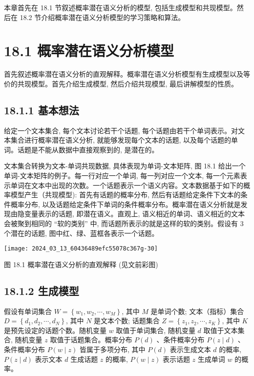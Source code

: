 \documentclass[10pt]{article}
\begin{document}
本章首先在 18.1 节叙述概率潜在语义分析的模型, 包括生成模型和共现模型。然后在 18.2 节介绍概率潜在语义分析模型的学习策略和算法。

\section*{18.1 概率潜在语义分析模型}
首先叙述概率潜在语义分析的直观解释。概率潜在语义分析模型有生成模型以及等价的共现模型。首先介绍生成模型, 然后介绍共现模型, 最后讲解模型的性质。

\subsection*{18.1.1 基本想法}
给定一个文本集合, 每个文本讨论若干个话题, 每个话题由若干个单词表示。对文本集合进行概率潜在语义分析, 就能够发现每个文本的话题, 以及每个话题的单词。话题是不能从数据中直接观察到的, 是潜在的。

文本集合转换为文本-单词共现数据, 具体表现为单词-文本矩阵, 图 18.1 给出一个单词-文本矩阵的例子。每一行对应一个单词, 每一列对应一个文本, 每一个元素表示单词在文本中出现的次数。一个话题表示一个语义内容。文本数据基于如下的概率模型产生（共现模型): 首先有话题的概率分布, 然后有话题给定条件下文本的条件概率分布, 以及话题给定条件下单词的条件概率分布。概率潜在语义分析就是发现由隐变量表示的话题, 即潜在语义。直观上, 语义相近的单词、语义相近的文本会被聚到相同的 “软的类别” 中, 而话题所表示的就是这样的软的类别。假设有 3 个潜在的话题, 图中红、绿、蓝框各表示一个话题。

\begin{center}
\texttt{[image: 2024\_03\_13\_60436489efc55078c367g-30]}
\end{center}

图 18.1 概率潜在语义分析的直观解释 (见文前彩图)

\subsection*{18.1.2 生成模型}
假设有单词集合 $W=\left\{w_{1}, w_{2}, \cdots, w_{M}\right\}$, 其中 $M$ 是单词个数; 文本（指标）集合 $D=\left\{d_{1}, d_{2}, \cdots, d_{N}\right\}$, 其中 $N$ 是文本个数; 话题集合 $Z=\left\{z_{1}, z_{2}, \cdots, z_{K}\right\}$, 其中 $K$ 是预先设定的话题个数。随机变量 $w$ 取值于单词集合, 随机变量 $d$ 取值于文本集合, 随机变量 $z$ 取值于话题集合。概率分布 $P(d)$ 、条件概率分布 $P(z \mid d)$ 、条件概率分布 $P(w \mid z)$ 皆属于多项分布, 其中 $P(d)$ 表示生成文本 $d$ 的概率, $P(z \mid d)$ 表示文本 $d$ 生成话题 $z$ 的概率, $P(w \mid z)$ 表示话题 $z$ 生成单词 $w$ 的概率。
\end{document}
